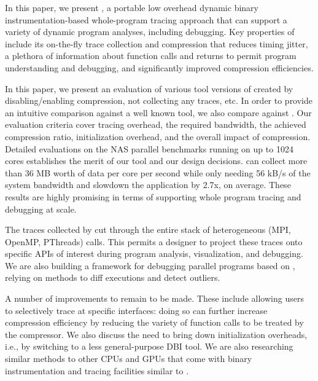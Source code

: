 
In this paper, 
we present \parlot, a portable low overhead dynamic
binary instrumentation-based
whole-program
tracing approach that can support a variety of 
dynamic program analyses, including debugging.
%
Key properties of \parlot include its on-the-fly trace collection and
compression that reduces timing jitter, a plethora of information
about function calls and returns to permit program understanding
and debugging, and
significantly improved compression efficiencies.


In this paper, we present an evaluation of various tool versions of \parlot
created by disabling/enabling compression, not collecting any traces, etc.
%
In order to provide an intuitive comparison against a well known tool,
we also compare \parlot against \callgrind.
%
Our evaluation criteria cover tracing overhead, the required bandwidth,
the achieved compression ratio, initialization overhead, and the 
overall impact of compression.
%
Detailed evaluations on the NAS parallel benchmarks running on
up to 1024 cores establishes the merit of our tool and our design decisions. 
\parlot can collect more than 36 MB worth of data per core per second while 
only needing 56 kB/s of the system bandwidth and slowdown the 
application by 2.7x, on average.
%
These results are highly promising in terms of supporting 
whole program tracing and debugging at scale.


The traces collected by \parlot cut through the entire stack of heterogeneous
(MPI, OpenMP, PThreads) calls. 
%
This permits a designer to project these traces onto specific
APIs of interest during program analysis, visualization, and debugging.
%
We are also building a framework for debugging parallel
programs based on \parlot, relying on
methods to diff executions and detect outliers.


A number of improvements to \parlot remain to be made.
%
These include allowing users to selectively trace at specific
interfaces: doing so can further increase compression efficiency
by reducing the variety of function calls to be treated by
the compressor.
%
We also discuss the need to bring down initialization overheads, i.e.,
by switching to a less general-purpose DBI tool.
%
We are also researching similar methods to
other CPUs and GPUs that come with binary instrumentation and tracing
facilities similar to \pin.
%

